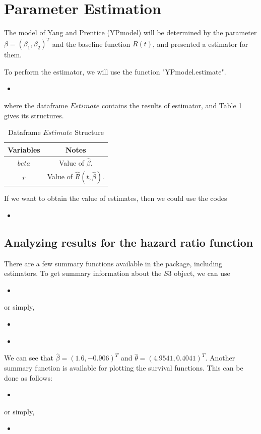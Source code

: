 \documentclass[12pt]{article}
\newcommand{\insertcode}[2]{\begin{itemize}\item[]\end{itemize}} %
\begin{document}
\section{Parameter Estimation}\label{Section:estimation}
 The model of Yang and Prentice (YPmodel) will be determined by the parameter $\beta = (\beta_1, \beta_2)^T$ and the baseline function $R(t)$, and \cite{yang2005semiparametric} presented a estimator for them.

To perform the estimator, we will use the function "YPmodel.estimate".
\insertcode{"Scripts/code7 - 2.pl"}{Performing estimator.}
where the dataframe $Estimate$ contains the results of estimator, and Table \ref{Tab:EstimateStructure} gives its structures.

\begin{table}[!h]
\renewcommand{\arraystretch}{1.3}
\caption{Dataframe $Estimate$ Structure} \label{Tab:EstimateStructure} \centering
\begin{tabular}{|c||c|}
  \hline
  Variables & Notes  \\
  \hline
  $beta$ & Value of $\hat{\beta}$. \\
  $r$ & Value of $\hat{R}(t,\hat{\beta})$. \\
  \hline
\end{tabular}
\end{table}

If we want to obtain the value of estimates, then we could use the codes
\insertcode{"Scripts/result13.pl"}{Getting value of $\hat{\beta}$.}

\subsection{Analyzing results for the hazard ratio function}
There are a few summary functions available in the package, including estimators.
To get summary information about the $S3$ object, we can use

\insertcode{"Scripts/code10.pl"}{Summarizing estimates' results.}
or simply,
\insertcode{"Scripts/code10s.pl"}{Summarizing estimates' results.}
\insertcode{"Scripts/result10.pl"}{Summarizing estimates' results.}

We can see that $\hat{\beta}=(1.6,-0.906)^T$ and $\hat{\theta}=(4.9541,0.4041)^T$.
Another summary function is available for plotting the survival functions. This can be done as follows:
\insertcode{"Scripts/code12.pl"}{}
or simply,
\insertcode{"Scripts/code12s.pl"}{Plotting estimates' results.}
\end{document}
